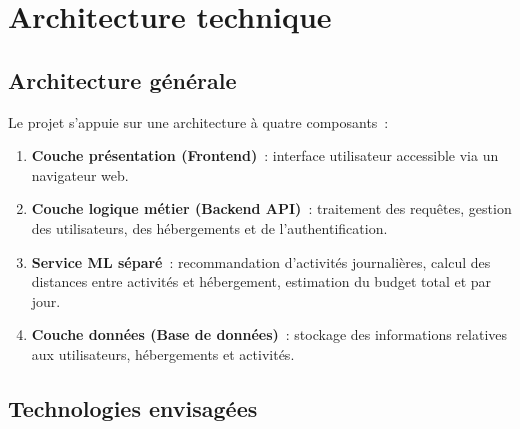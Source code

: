 \documentclass[12pt,a4paper]{report}
\begin{document}
\chapter{Architecture technique}

\section{Architecture générale}

Le projet s'appuie sur une architecture à quatre composants~:

\begin{enumerate}
  \item \textbf{Couche présentation (Frontend)}~: interface utilisateur
        accessible via un navigateur web.
  \item \textbf{Couche logique métier (Backend API)}~: traitement des requêtes,
        gestion des utilisateurs, des hébergements et de l'authentification.
  \item \textbf{Service ML séparé}~: recommandation d'activités journalières,
        calcul des distances entre activités et hébergement, estimation du
        budget total et par jour.
  \item \textbf{Couche données (Base de données)}~: stockage des informations
        relatives aux utilisateurs, hébergements et activités.
\end{enumerate}

\section{Technologies envisagées}
\end{document}
